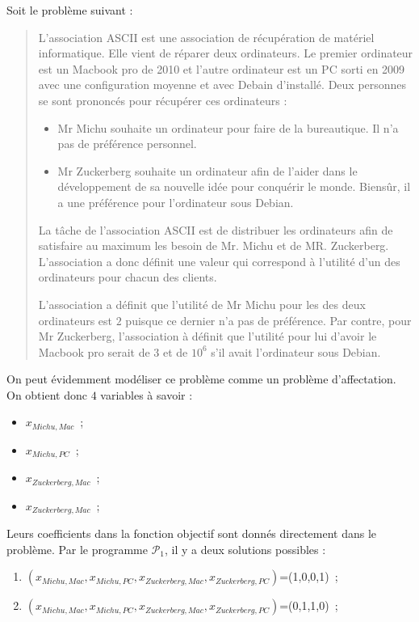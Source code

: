 \documentclass[a4paper, titlepage, oneside, 12pt]{article}%
\begin{document}
Soit le problème suivant :
\begin{quotation}
L'association ASCII est une association de récupération de matériel informatique. Elle vient de réparer deux ordinateurs. Le premier ordinateur est un Macbook pro de 2010 et l'autre ordinateur est un PC sorti en 2009 avec une configuration moyenne et avec Debain d'installé. Deux personnes se sont prononcés pour récupérer ces ordinateurs :
\begin{itemize}
\item Mr Michu souhaite un ordinateur pour faire de la bureautique. Il n'a pas de préférence personnel.
\item Mr Zuckerberg souhaite un ordinateur afin de l'aider dans le développement de sa nouvelle idée pour conquérir le monde. Biensûr, il a une préférence pour l'ordinateur sous Debian.
\end{itemize}

La tâche de l'association ASCII est de distribuer les ordinateurs afin de satisfaire au maximum les besoin de Mr. Michu et de MR. Zuckerberg. L'association a donc définit une valeur qui correspond à l'utilité d'un des ordinateurs pour chacun des clients.

L'association a définit que l'utilité de Mr Michu pour les des deux ordinateurs est $2$ puisque ce dernier n'a pas de préférence.
Par contre, pour Mr Zuckerberg, l'association à définit que l'utilité pour lui d'avoir le Macbook pro serait de $3$ et de $10^6$ s'il avait l'ordinateur sous Debian. 
\end{quotation}

On peut évidemment modéliser ce problème comme un problème d'affectation. On obtient donc $4$ variables à savoir :
\begin{itemize}
\item $x_{Michu, Mac}$~;
\item $x_{Michu, PC}$~;
\item $x_{Zuckerberg, Mac}$~;
\item $x_{Zuckerberg, Mac}$~;
\end{itemize}

Leurs coefficients dans la fonction objectif sont donnés directement dans le problème. Par le programme $\mathcal{P}_1$, il y a deux solutions possibles : 
\begin{enumerate}
\item $(x_{Michu, Mac},x_{Michu, PC},x_{Zuckerberg, Mac},x_{Zuckerberg, PC})$=(1,0,0,1)~;
\item $(x_{Michu, Mac},x_{Michu, PC},x_{Zuckerberg, Mac},x_{Zuckerberg, PC})$=(0,1,1,0)~;
\end{enumerate}
\end{document}
